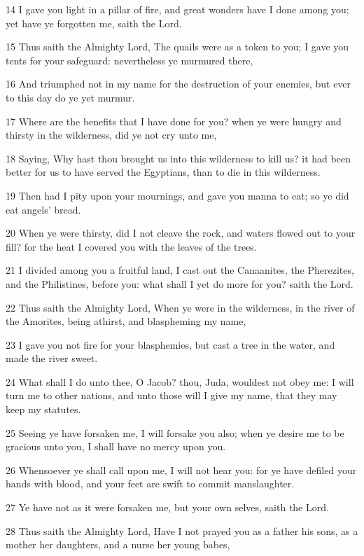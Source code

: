 \par 14 I gave you light in a pillar of fire, and great wonders have I done among you; yet have ye forgotten me, saith the Lord.
\par 15 Thus saith the Almighty Lord, The quails were as a token to you; I gave you tents for your safeguard: nevertheless ye murmured there,
\par 16 And triumphed not in my name for the destruction of your enemies, but ever to this day do ye yet murmur.
\par 17 Where are the benefits that I have done for you? when ye were hungry and thirsty in the wilderness, did ye not cry unto me,
\par 18 Saying, Why hast thou brought us into this wilderness to kill us? it had been better for us to have served the Egyptians, than to die in this wilderness.
\par 19 Then had I pity upon your mournings, and gave you manna to eat; so ye did eat angels' bread.
\par 20 When ye were thirsty, did I not cleave the rock, and waters flowed out to your fill? for the heat I covered you with the leaves of the trees.
\par 21 I divided among you a fruitful land, I cast out the Canaanites, the Pherezites, and the Philistines, before you: what shall I yet do more for you? saith the Lord.
\par 22 Thus saith the Almighty Lord, When ye were in the wilderness, in the river of the Amorites, being athirst, and blaspheming my name,
\par 23 I gave you not fire for your blasphemies, but cast a tree in the water, and made the river sweet.
\par 24 What shall I do unto thee, O Jacob? thou, Juda, wouldest not obey me: I will turn me to other nations, and unto those will I give my name, that they may keep my statutes.
\par 25 Seeing ye have forsaken me, I will forsake you also; when ye desire me to be gracious unto you, I shall have no mercy upon you.
\par 26 Whensoever ye shall call upon me, I will not hear you: for ye have defiled your hands with blood, and your feet are swift to commit manslaughter.
\par 27 Ye have not as it were forsaken me, but your own selves, saith the Lord.
\par 28 Thus saith the Almighty Lord, Have I not prayed you as a father his sons, as a mother her daughters, and a nurse her young babes,
